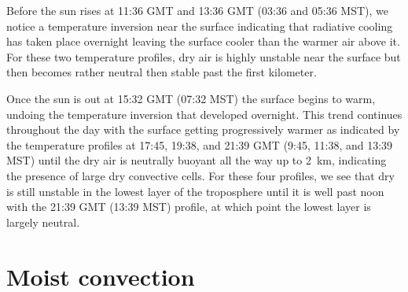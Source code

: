 \documentclass[11pt]{article}
\begin{document}
Before the sun rises at 11:36 GMT and 13:36 GMT (03:36 and 05:36 MST), we notice a temperature inversion near the surface indicating that radiative cooling has taken place overnight leaving the surface cooler than the warmer air above it. For these two temperature profiles, dry air is highly unstable near the surface but then becomes rather neutral then stable past the first kilometer.

Once the sun is out at 15:32 GMT (07:32 MST) the surface begins to warm, undoing the temperature inversion that developed overnight. This trend continues throughout the day with the surface getting progressively warmer as indicated by the temperature profiles at 17:45, 19:38, and 21:39 GMT (9:45, 11:38, and 13:39 MST) until the dry air is neutrally buoyant all the way up to \SI{2}{\km}, indicating the presence of large dry convective cells. For these four profiles, we see that dry is still unstable in the lowest layer of the troposphere until it is well past noon with the 21:39 GMT (13:39 MST) profile, at which point the lowest layer is largely neutral.

\section{Moist convection}


%
\end{document}
